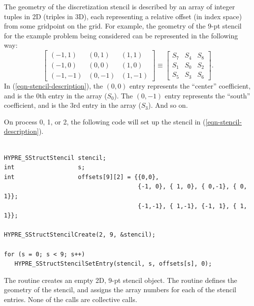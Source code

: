 The geometry of the discretization stencil is described by an array of
integer tuples in 2D (triples in 3D), each representing a relative
offset (in index space) from some gridpoint on the grid.  For example,
the geometry of the 9-pt stencil for the example problem being
considered can be represented in the following way:
\begin{equation}\label{sstruct:eqn-stencil-description}
\left [
\begin{array}{ccc}
(-1, 1) & ( 0, 1) & ( 1, 1) \\
(-1, 0) & ( 0, 0) & ( 1, 0) \\
(-1,-1) & ( 0,-1) & ( 1,-1) 
\end{array}
\right ]
\equiv
\left [
\begin{array}{ccc}
S_7 & S_4 & S_8 \\
S_1 & S_0 & S_2 \\
S_5 & S_3 & S_6
\end{array}
\right ] .
\end{equation}
In (\ref{eqn-stencil-description}), the $(0,0)$ entry represents the
``center'' coefficient, and is the 0th entry in the array ($S_0$).
The $(0,-1)$ entry represents the ``south'' coefficient, and is the
3rd entry in the array ($S_3$).  And so on.

On process 0, 1, or 2, the following code will set up the stencil in
(\ref{eqn-stencil-description}).
\begin{display}
\begin{verbatim}

HYPRE_SStructStencil stencil;
int                  s;
int                  offsets[9][2] = {{0,0},
                                      {-1, 0}, { 1, 0}, { 0,-1}, { 0, 1}};
                                      {-1,-1}, { 1,-1}, {-1, 1}, { 1, 1}};

HYPRE_SStructStencilCreate(2, 9, &stencil);

for (s = 0; s < 9; s++)
   HYPRE_SStructStencilSetEntry(stencil, s, offsets[s], 0);

\end{verbatim}
\end{display}
The  routine creates an empty 2D,
9-pt stencil object.  The 
routine defines the geometry of the stencil, and assigns the array
numbers for each of the stencil entries.  None of the calls are
collective calls.


